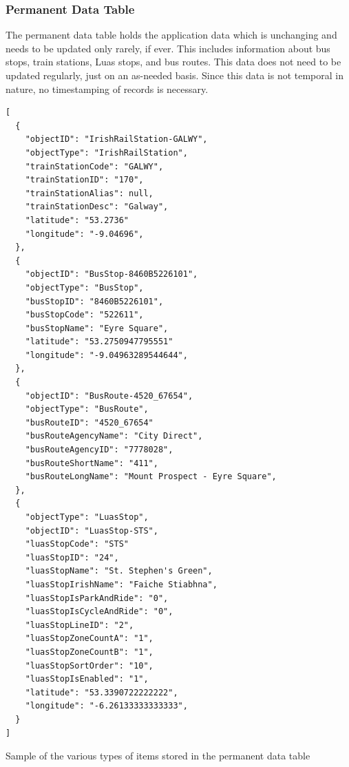 \documentclass[a4paper,11pt]{report}
\newenvironment{code}{\captionsetup{type=listing}}{}
\begin{document}
\subsubsection{Permanent Data Table}
The permanent data table holds the application data which is unchanging and needs to be updated only rarely, if ever.
This includes information about bus stops, train stations, Luas stops, and bus routes.
This data does not need to be updated regularly, just on an as-needed basis.
Since this data is not temporal in nature, no timestamping of records is necessary.

\begin{code}
\begin{verbatim}
[
  {
    "objectID": "IrishRailStation-GALWY",
    "objectType": "IrishRailStation",
    "trainStationCode": "GALWY",
    "trainStationID": "170",
    "trainStationAlias": null,
    "trainStationDesc": "Galway",
    "latitude": "53.2736"
    "longitude": "-9.04696",
  },
  {
    "objectID": "BusStop-8460B5226101",
    "objectType": "BusStop",
    "busStopID": "8460B5226101",
    "busStopCode": "522611",
    "busStopName": "Eyre Square",
    "latitude": "53.2750947795551"
    "longitude": "-9.04963289544644",
  },
  {
    "objectID": "BusRoute-4520_67654",
    "objectType": "BusRoute",
    "busRouteID": "4520_67654"
    "busRouteAgencyName": "City Direct",
    "busRouteAgencyID": "7778028",
    "busRouteShortName": "411",
    "busRouteLongName": "Mount Prospect - Eyre Square",
  },
  {
    "objectType": "LuasStop",
    "objectID": "LuasStop-STS",
    "luasStopCode": "STS"
    "luasStopID": "24",
    "luasStopName": "St. Stephen's Green",
    "luasStopIrishName": "Faiche Stiabhna",
    "luasStopIsParkAndRide": "0",
    "luasStopIsCycleAndRide": "0",
    "luasStopLineID": "2",
    "luasStopZoneCountA": "1",
    "luasStopZoneCountB": "1",
    "luasStopSortOrder": "10",
    "luasStopIsEnabled": "1",
    "latitude": "53.3390722222222",
    "longitude": "-6.26133333333333",
  }
]
\end{verbatim}
\caption{Sample of the various types of items stored in the permanent data table}
\label{listing:permanent_data}
\end{code}
\end{document}
